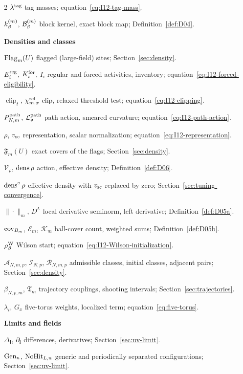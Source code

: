 \begin{multicols}{2}
$\lambda^{\rm tag}$ tag masses; equation~\eqref{eq:I12-tag-mass}.

$k^{(m)}_\beta$, $\mathcal{B}^{(m)}_\beta$ block kernel, exact block map; Definition~\ref{def:D04}.

\medskip\textbf{Densities and classes}\par
$\operatorname{Flag}_m(U)$ flagged (large-field) sites; Section~\ref{sec:density}.

$E_i^{\rm reg}$, $K_i^{\rm for}$, $I_i$ regular and forced activities, inventory; equation~\eqref{eq:I12-forced-eligibility}.

$\operatorname{clip}_t$, $\chi^{\rm rel}_{m,x}$ clip, relaxed threshold test; equation~\eqref{eq:I12-clipping}.

$P^{\mathrm{path}}_{N,m}$, $\mathcal L^{\rm path}_{\mathfrak p}$ path action, smeared curvature; equation~\eqref{eq:I12-path-action}.

$\rho$, $v_{\rm sc}$ representation, scalar normalization; equation~\eqref{eq:I12-representation}.

$\mathfrak F_m(U)$ exact covers of the flags; Section~\ref{sec:density}.

$\mathcal V_\rho$, $\operatorname{dens}\rho$ action, effective density; Definition~\ref{def:D06}.

$\operatorname{dens}^\circ\rho$ effective density with $v_{\rm sc}$ replaced by zero; Section~\ref{sec:tuning-convergence}.

$\|\cdot\|_m$, $D^L$ local derivative seminorm, left derivative; Definition~\ref{def:D05a}.

$\operatorname{cov}_{B_m}$, $\mathcal E_m$, $\mathcal K_m$ ball-cover count, weighted sums; Definition~\ref{def:D05b}.

$\rho^{\rm W}_\beta$ Wilson start; equation~\eqref{eq:I12-Wilson-initialization}.

$\mathcal A_{N,m,p}$, $\mathcal I_{N,p}$, $\mathcal R_{N,m,p}$ admissible classes, initial classes, adjacent pairs; Section~\ref{sec:density}.

$\beta_{N,p,m}$, $\mathfrak T_m$ trajectory couplings, shooting intervals; Section~\ref{sec:trajectories}.

$\lambda_i$, $G_x$ five-torus weights, localized term; equation~\eqref{eq:five-torus}.

\medskip\textbf{Limits and fields}\par
$\Delta_{\boldsymbol l}$, $\partial_{\boldsymbol l}$ differences, derivatives; Section~\ref{sec:uv-limit}.

$\mathrm{Gen}_{n}$, $\mathrm{NoHit}_{L,n}$ generic and periodically separated configurations; Section~\ref{sec:uv-limit}.


\end{multicols}
